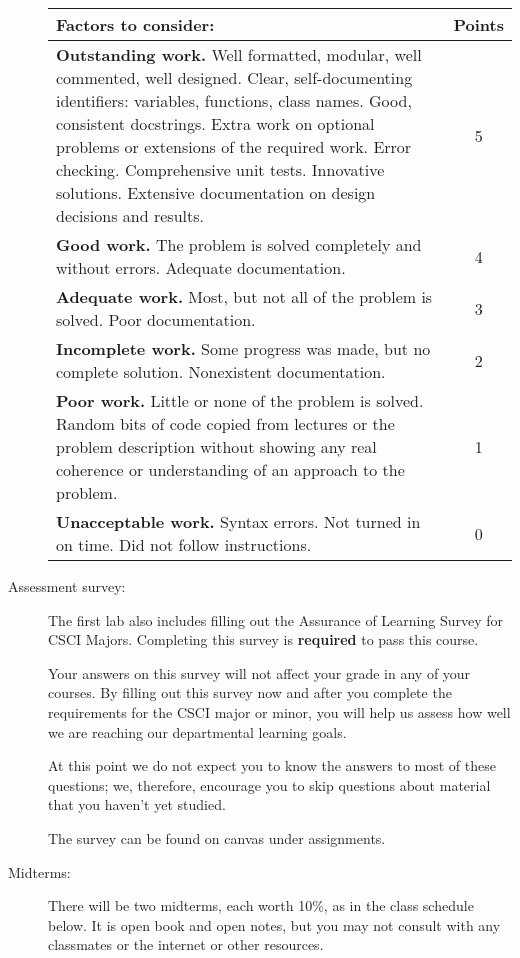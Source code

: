 \documentclass[12pt]{article}
\begin{document}
\begin{description}
\begin{tabular}{p{}|c}
\bf Factors to consider: & \bf Points \\\hline
{\bf Outstanding work.}    Well formatted, modular,
well commented, well designed.  
Clear, self-documenting identifiers: variables, functions, class names.
Good, consistent docstrings.
 Extra work on optional problems or extensions
of the required work.  Error checking.  Comprehensive unit tests. Innovative solutions.
Extensive documentation on design decisions and results.
 & 5 \\\hline
{\bf Good work.}  The problem is solved completely and without errors.
Adequate documentation.
 & 4 \\\hline
{\bf Adequate work.}  Most, but not all of the problem is solved.  Poor documentation.
 & 3 \\\hline
 {\bf Incomplete work.}  Some progress was made, but no complete solution.
 Nonexistent documentation.
 & 2 \\\hline
{\bf Poor work.}  Little or none of the problem is solved.  Random bits of code copied
from lectures or the problem description without showing any real coherence
or understanding of an approach to the problem.
 & 1 \\\hline
{\bf Unacceptable work.}
 Syntax errors.  Not turned in on time.  Did not follow instructions. & 0 \\
\end{tabular}

\item[Assessment survey:]
The first lab also includes filling out the Assurance of Learning Survey for CSCI Majors.
Completing this survey is {\bf required} to pass this course.

Your answers on this survey will not affect your grade in any of your courses.
By filling out this survey now and after you complete the requirements for the CSCI
major or minor, you will help us assess how well we are reaching our departmental
learning goals.

At this point we do not expect you to know the answers to most of these questions;
we, therefore, encourage you to skip questions about material that you haven’t yet
studied.

The survey can be found on canvas under assignments.

\item[Midterms:]  There will be two midterms, each worth 10\%, as
in the class schedule below.   It is open
book and open notes, but you may not consult with any classmates
or the internet or other resources.



\end{description}
\end{document}
